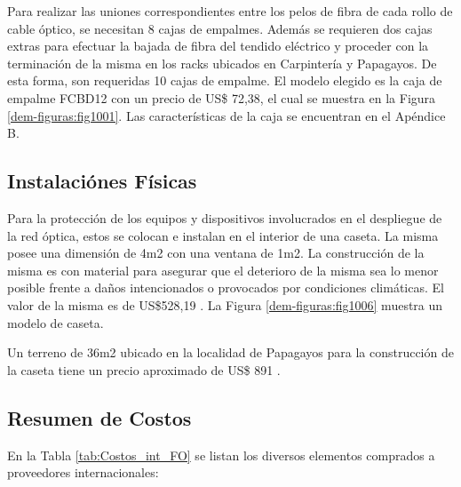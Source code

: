 Para realizar las uniones correspondientes entre los pelos de fibra de  cada rollo de cable óptico, se necesitan 8 cajas de empalmes. Además se requieren dos cajas  extras para efectuar la bajada de fibra del tendido eléctrico y proceder con la terminación de la misma en los racks ubicados en Carpintería y Papagayos. De esta forma, son requeridas 10 cajas de empalme.
El modelo elegido es la caja de empalme FCBD12 con un precio de US\$ 72,38, el cual se muestra en la Figura \ref{dem-figuras:fig1001}. Las características de la caja se encuentran en el Apéndice B.


\subsection{Instalaciónes Físicas}


Para la protección de los equipos y dispositivos involucrados en el despliegue de la red óptica, estos se colocan e instalan en el interior de una caseta. La misma posee una dimensión de 4m2 con una ventana de 1m2. La construcción de la misma es con material para asegurar que el deterioro de la misma sea lo menor posible frente a daños intencionados o provocados por condiciones climáticas. El valor de la misma es de US\$528,19 \cite{modplant3}. La Figura \ref{dem-figuras:fig1006} muestra un modelo de caseta.




Un terreno de 36m2 ubicado en la localidad de Papagayos para la construcción de la caseta tiene un precio aproximado de US\$ 891 \cite{terreno1duplicado} \cite{terreno2duplicado} \cite{terreno3duplicado}.

\subsection{Resumen de Costos}

En la Tabla \ref{tab:Costos_int_FO} se listan los diversos elementos comprados a proveedores internacionales:

